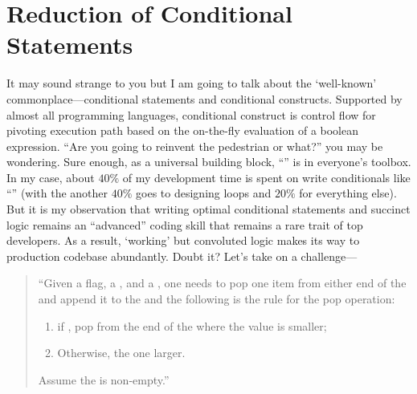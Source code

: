 
\chapter{Reduction of Conditional Statements}\label{ch:organizeYourIfElse}

It may sound strange to you but I am going to talk about the `well-known'
commonplace---conditional statements and conditional constructs.
Supported by almost all programming languages, conditional construct is control
flow for pivoting execution path based on the on-the-fly evaluation of a boolean expression.
``Are you going to reinvent the pedestrian or what?'' you may be wondering.
Sure enough, as a universal building block, ``'' is in everyone's toolbox.
In my case, about $40\%$ of my development time is spent on write
conditionals like ``'' (with the another $40\%$ goes to designing loops and $20\%$
for everything else).
But it is my observation that writing optimal conditional statements and
succinct logic remains an ``advanced'' coding skill that remains a rare trait of top developers.
As a result, `working' but convoluted logic makes its way to production codebase abundantly.
Doubt it?
Let's take on a challenge---
\begin{quote}
    ``Given a  flag, a , and a , one
    needs to pop one item from either end of the  and append it
    to the  and the following is the rule for the pop operation:
    \begin{enumerate}
        \item if , pop from the end of the  where the value is
        smaller;
        \item Otherwise, the one larger.
    \end{enumerate}
    Assume the  is non-empty.''
\end{quote}
